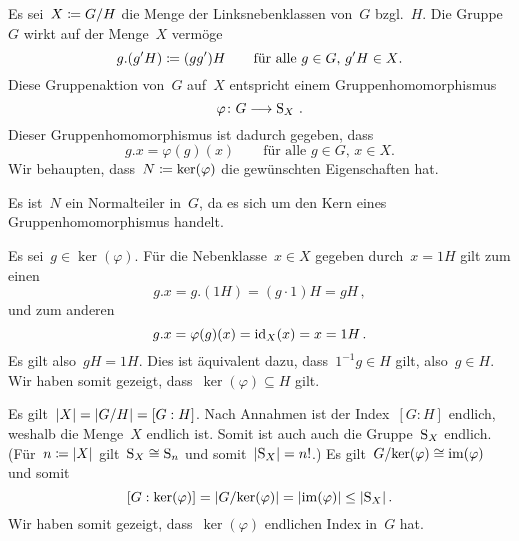 \documentclass{scrartcl}
\begin{document}
\begin{solution}
  Es sei~$X \coloneqq G/H$ die Menge der Linksnebenklassen von~$G$ bzgl.~$H$.
  Die Gruppe~$G$ wirkt auf der Menge~$X$ vermöge
  \[
    g . (g' H)
    \coloneqq
    (g g') H
    \qquad
    \text{für alle~$g \in G$,~$g'H \in X$.}
  \]
  Diese Gruppenaktion von~$G$ auf~$X$ entspricht einem Gruppenhomomorphismus
  \[
    \varphi
    \colon
    G \to \Sym_X \,.
  \]
  Dieser Gruppenhomomorphismus ist dadurch gegeben, dass
  \[
    g.x = \varphi(g)(x)
    \qquad
    \text{für alle~$g \in G$,~$x \in X$.}
  \]
  Wir behaupten, dass~$N \coloneqq \ker(\varphi)$ die gewünschten Eigenschaften hat.

  Es ist~$N$ ein Normalteiler in~$G$, da es sich um den Kern eines Gruppenhomomorphismus handelt.

  Es sei~$g \in \ker(\varphi)$.
  Für die Nebenklasse~$x \in X$ gegeben durch~$x = 1H$ gilt zum einen
  \[
    g.x
    =
    g . (1H)
    =
    (g \cdot 1) H
    =
    gH \,,
  \]
  und zum anderen
  \[
    g.x
    =
    \varphi(g)(x)
    =
    \mathrm{id}_X(x)
    =
    x
    =
    1H \,.
  \]
  Es gilt also~$gH = 1H$.
  Dies ist äquivalent dazu, dass~$1^{-1} g \in H$ gilt, also~$g \in H$.
  Wir haben somit gezeigt, dass~$\ker(\varphi) \subseteq H$ gilt.

  Es gilt~$\lvert X\rvert = \lvert G/H\rvert = [G : H]$.
  Nach Annahmen ist der Index~$[G : H]$ endlich, weshalb die Menge~$X$ endlich ist.
  Somit ist auch auch die Gruppe~$\operatorname{S}_X$ endlich.
  (Für~$n \coloneqq \lvert X\rvert$ gilt~$\operatorname{S}_X \cong \operatorname{S}_n$ und somit~$\lvert \operatorname{S}_X \rvert = n!$.)
  Es gilt~$G / {\ker(\varphi)} \cong \operatorname{im}(\varphi)$ und somit
  \[
    [G : \ker(\varphi)]
    =
    \lvert G / {\ker(\varphi)} \rvert
    =
    \lvert \operatorname{im}(\varphi) \rvert
    \leq
    \lvert \operatorname{S}_X \rvert \,.
  \]
  Wir haben somit gezeigt, dass~$\ker(\varphi)$ endlichen Index in~$G$ hat.
\end{solution}






\printsolutions
\end{document}

